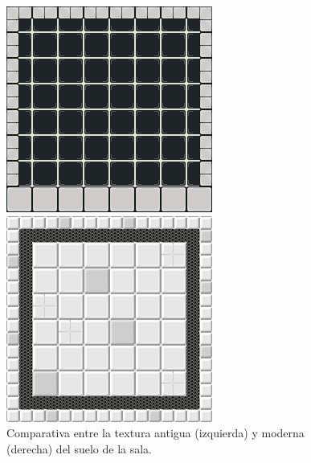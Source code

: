 \begin{figure}[!htb]
   \begin{minipage}{0.4\textwidth}
     \centering
     \includegraphics[width=0.9\linewidth, right]{images/resultados/desarrollo/paredes_origen}
   \end{minipage}\hfill
   \begin {minipage}{0.4\textwidth}
     \centering
     \includegraphics[width=0.9\linewidth, left]{images/resultados/desarrollo/paredes_final}
   \end{minipage}
   \caption{Comparativa entre la textura antigua (izquierda) y moderna (derecha) del suelo de la sala.}
   \label{comparativa_texturas}
\end{figure}

